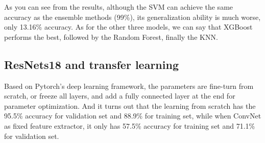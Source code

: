 \documentclass[12pt]{article}
\begin{document}
\begin{table}[h]
\centering
{}
\caption{Four models comparison}
\end{table}

As you can see from the results, although the SVM can achieve the same accuracy as the ensemble methods (99\%), its generalization ability is much worse, only 13.16\% accuracy. As for the other three models, we can say that XGBoost performs the best, followed by the Random Forest, finally the KNN. 
    
\subsection{ResNets18 and transfer learning}
Based on Pytorch's deep learning framework, the parameters are fine-turn from scratch, or freeze all layers, and add a fully connected layer at the end for parameter optimization. And it turns out that the learning from scratch has the 95.5\% accuracy for validation set and 88.9\% for training set, while when ConvNet as fixed feature extractor, it only has 57.5\% accuracy for training set and 71.1\% for validation set.
\end{document}
